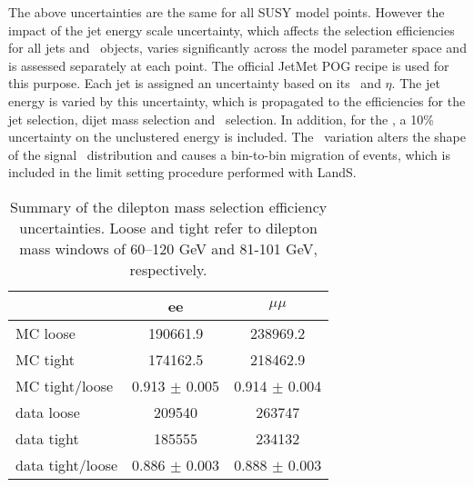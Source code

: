 The above uncertainties are the same for all SUSY model points. However the impact of the jet energy scale uncertainty, which
affects the selection efficiencies for all jets and \MET\ objects, varies significantly across the model parameter space and
is assessed separately at each point. The official JetMet POG recipe is used for this purpose. Each jet is assigned an uncertainty
based on its \pt\ and $\eta$. The jet energy is varied by this uncertainty, which is propagated to the efficiencies for the jet selection, 
dijet mass selection and \MET\ selection. In addition, for the \MET, a 10\% uncertainty on the unclustered energy is included.
The \MET\ variation alters the shape of the signal \MET\ distribution and causes a bin-to-bin migration of events, which is 
included in the limit setting procedure performed with LandS.

\begin{table}[htb]
\begin{center}
\footnotesize
\caption{\label{tab:mllsyst} Summary of the dilepton mass selection efficiency uncertainties. Loose and tight refer to dilepton
mass windows of 60--120 GeV and 81-101 GeV, respectively.}
\begin{tabular}{l|c|c}
\hline
\hline
 & ee & $\mu\mu$ \\
\hline
MC loose & 190661.9 & 238969.2 \\
MC tight & 174162.5 & 218462.9 \\  
MC tight/loose & 0.913 $\pm$ 0.005 & 0.914 $\pm$ 0.004 \\
\hline
data loose & 209540 & 263747 \\
data tight & 185555 & 234132 \\
data tight/loose & 0.886 $\pm$ 0.003 & 0.888 $\pm$ 0.003 \\
\hline
\hline
\end{tabular}
\end{center}
\end{table}
